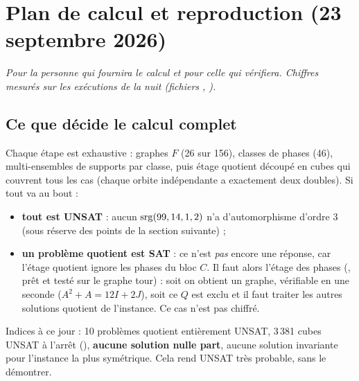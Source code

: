\section{Plan de calcul et reproduction (23 septembre 2026)}\label{sec:plan}
\emph{Pour la personne qui fournira le calcul et pour celle qui vérifiera. Chiffres mesurés sur les exécutions de la nuit (fichiers
, ).}

\subsection{Ce que décide le calcul complet}
Chaque étape est exhaustive : graphes $F$ (26 sur 156), classes de phases (46), multi-ensembles de supports par classe, puis étage quotient
découpé en cubes qui couvrent tous les cas (chaque orbite indépendante a exactement deux doubles). Si tout va au bout :
\begin{itemize}[nosep]
\item \textbf{tout est UNSAT} : aucun $\operatorname{srg}(99,14,1,2)$ n'a d'automorphisme d'ordre 3 (sous réserve des points de la section suivante) ;
\item \textbf{un problème quotient est SAT} : ce n'est \emph{pas} encore une réponse, car l'étage quotient ignore les phases du bloc $C$.
Il faut alors l'étage des phases (, prêt et testé sur le graphe tour) : soit on obtient un graphe, vérifiable en une seconde
($A^2+A=12I+2J$), soit ce $Q$ est exclu et il faut traiter les autres solutions quotient de l'instance. Ce cas n'est pas chiffré.
\end{itemize}
{\sloppy Indices à ce jour : 10 problèmes quotient entièrement UNSAT, 3\,381 cubes UNSAT à l'arrêt (), \textbf{aucune solution nulle part}, aucune solution
invariante pour l'instance la plus symétrique. Cela rend UNSAT très probable, sans le démontrer.\par}

